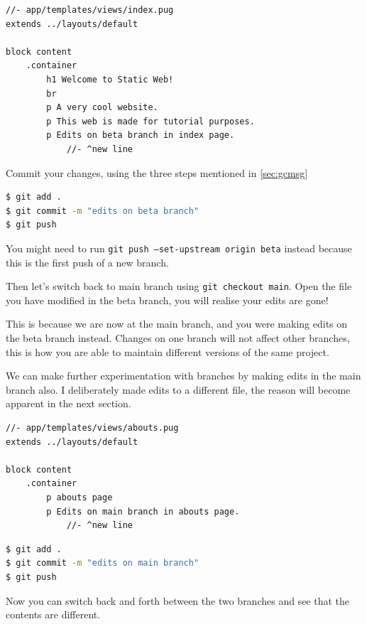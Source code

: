 \begin{lstlisting}[language=pug]
//- app/templates/views/index.pug
extends ../layouts/default

block content
	.container
		h1 Welcome to Static Web!
		br
		p A very cool website.
		p This web is made for tutorial purposes.
		p Edits on beta branch in index page.  
		    //- ^new line
\end{lstlisting}

Commit your changes, using the three steps mentioned in \cref{sec:gcmsg}

\begin{lstlisting}[language=bash]
$ git add .
$ git commit -m "edits on beta branch"
$ git push
\end{lstlisting}

You might need to run \texttt{git push --set-upstream origin beta} instead because this is the first push of a new branch. 

Then let's switch back to main branch using \texttt{git checkout main}. Open the file you have modified in the beta branch, you will realise your edits are gone!

This is because we are now at the main branch, and you were making edits on the beta branch instead. Changes on one branch will not affect other branches, this is how you are able to maintain different versions of the same project.

We can make further experimentation with branches by making edits in the main branch also. I deliberately made edits to a different file, the reason will become apparent in the next section.

\begin{lstlisting}[language=pug]
//- app/templates/views/abouts.pug
extends ../layouts/default

block content
	.container
		p abouts page
		p Edits on main branch in abouts page.
		    //- ^new line
\end{lstlisting}

\begin{lstlisting}[language=bash]
$ git add .
$ git commit -m "edits on main branch"
$ git push
\end{lstlisting}

Now you can switch back and forth between the two branches and see that the contents are different.

